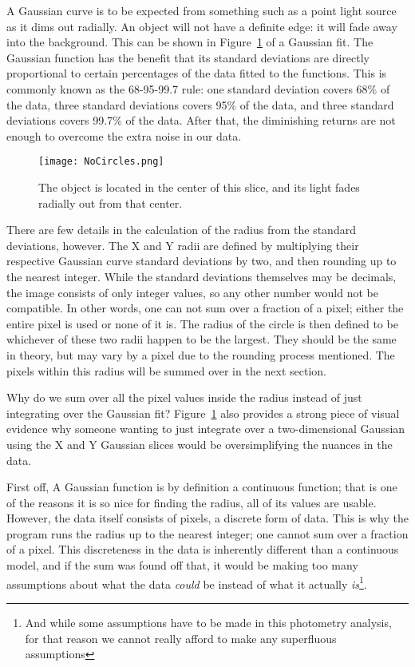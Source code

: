 A Gaussian curve is to be expected from something such as a point light source as it dims out radially. An object will not have a definite edge: it will fade away into the background. This can be shown in Figure~\ref{fig:NoCircles} of a Gaussian fit. The Gaussian function has the benefit that its standard deviations are directly proportional to certain percentages of the data fitted to the functions. This is commonly known as the 68-95-99.7 rule: one standard deviation covers 68\% of the data, three standard deviations covers 95\% of the data, and three standard deviations covers 99.7\% of the data. After that, the diminishing returns are not enough to overcome the extra noise in our data.

\begin{figure}[ht!]
	\centering
	\texttt{[image: NoCircles.png]}
	\caption{The object is located in the center of this slice, and its light fades radially out from that center.}
	\label{fig:NoCircles}
\end{figure}

There are few details in the calculation of the radius from the standard deviations, however. The X and Y radii are defined by multiplying their respective Gaussian curve standard deviations by two, and then rounding up to the nearest integer. While the standard deviations themselves may be decimals, the image consists of only integer values, so any other number would not be compatible. In other words, one can not sum over a fraction of a pixel; either the entire pixel is used or none of it is. The radius of the circle is then defined to be whichever of these two radii happen to be the largest. They should be the same in theory, but may vary by a pixel due to the rounding process mentioned. The pixels within this radius will be summed over in the next section. 

Why do we sum over all the pixel values inside the radius instead of just integrating over the Gaussian fit? Figure~\ref{fig:NoCircles} also provides a strong piece of visual evidence why someone wanting to just integrate over a two-dimensional Gaussian using the X and Y Gaussian slices would be oversimplifying the nuances in the data. 

First off, A Gaussian function is by definition a continuous function; that is one of the reasons it is so nice for finding the radius, all of its values are usable. However, the data itself consists of pixels, a discrete form of data. This is why the program runs the radius up to the nearest integer; one cannot sum over a fraction of a pixel. This discreteness in the data is inherently different than a continuous model, and if the sum was found off that, it would be making too many assumptions about what the data \textit{could} be instead of what it actually \textit{is}\footnote{And while some assumptions have to be made in this photometry analysis, for that reason we cannot really afford to make any superfluous assumptions}.

